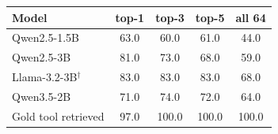 \begin{tabular}{lcccc}
\toprule
Model & top-1 & top-3 & top-5 & all 64 \\
\midrule
Qwen2.5-1.5B & 63.0 & 60.0 & 61.0 & 44.0 \\
Qwen2.5-3B & 81.0 & 73.0 & 68.0 & 59.0 \\
Llama-3.2-3B$^\dagger$ & 83.0 & 83.0 & 83.0 & 68.0 \\
Qwen3.5-2B & 71.0 & 74.0 & 72.0 & 64.0 \\
\midrule
Gold tool retrieved & 97.0 & 100.0 & 100.0 & 100.0 \\
\bottomrule
\end{tabular}